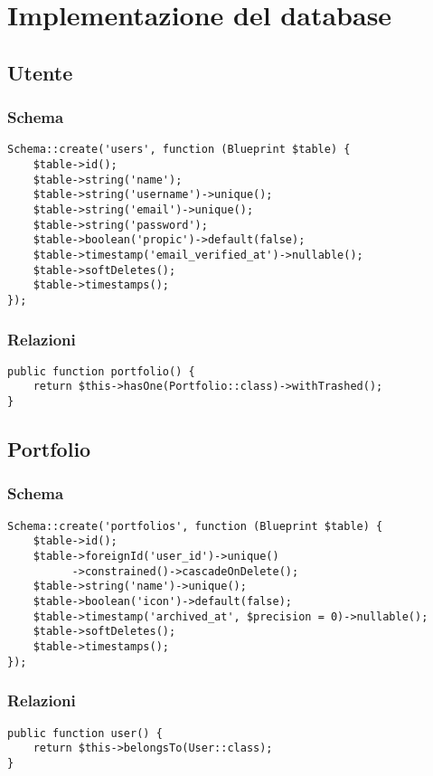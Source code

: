\chapter{Implementazione del database}\label{cap:implementazione_del_database}
\section{Utente}
\subsection{Schema}
\begin{lstlisting}
Schema::create('users', function (Blueprint $table) {
    $table->id();                   
    $table->string('name');
    $table->string('username')->unique();
    $table->string('email')->unique();
    $table->string('password');       
    $table->boolean('propic')->default(false);
    $table->timestamp('email_verified_at')->nullable();
    $table->softDeletes();
    $table->timestamps();
});
\end{lstlisting}
\subsection{Relazioni}
\begin{lstlisting}
public function portfolio() {
    return $this->hasOne(Portfolio::class)->withTrashed();
}
\end{lstlisting}
\newpage
\section{Portfolio}
\subsection{Schema}
\begin{lstlisting}
Schema::create('portfolios', function (Blueprint $table) {
	$table->id();
	$table->foreignId('user_id')->unique()
	      ->constrained()->cascadeOnDelete();
	$table->string('name')->unique();    
	$table->boolean('icon')->default(false);
	$table->timestamp('archived_at', $precision = 0)->nullable();    
	$table->softDeletes();
	$table->timestamps();
});
\end{lstlisting}
\subsection{Relazioni}
\begin{lstlisting}
public function user() {
	return $this->belongsTo(User::class);
}
\end{lstlisting}


